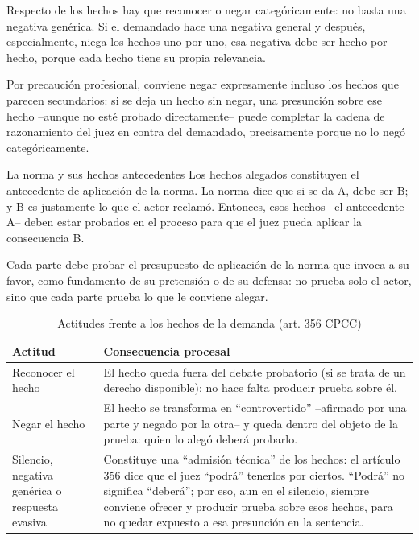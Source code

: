 \documentclass[12pt,oneside]{book}
\begin{document}
Respecto de los hechos hay que reconocer o negar categóricamente: no basta una negativa genérica. Si el demandado hace una negativa general y después, especialmente, niega los hechos uno por uno, esa negativa debe ser hecho por hecho, porque cada hecho tiene su propia relevancia.

\begin{note}
Por precaución profesional, conviene negar expresamente incluso los hechos que parecen secundarios: si se deja un hecho sin negar, una presunción sobre ese hecho --aunque no esté probado directamente-- puede completar la cadena de razonamiento del juez en contra del demandado, precisamente porque no lo negó categóricamente.
\end{note}

\begin{example}{La norma y sus hechos antecedentes}
Los hechos alegados constituyen el antecedente de aplicación de la norma. La norma dice que si se da A, debe ser B; y B es justamente lo que el actor reclamó. Entonces, esos hechos --el antecedente A-- deben estar probados en el proceso para que el juez pueda aplicar la consecuencia B.
\end{example}

Cada parte debe probar el presupuesto de aplicación de la norma que invoca a su favor, como fundamento de su pretensión o de su defensa: no prueba solo el actor, sino que cada parte prueba lo que le conviene alegar.

\begin{table}[H]
\centering
\caption{Actitudes frente a los hechos de la demanda (art. 356 CPCC)}
\begin{tabularx}{\textwidth}{>{\raggedright\arraybackslash}p{} >{\raggedright\arraybackslash}X}
\toprule
\textbf{Actitud} & \textbf{Consecuencia procesal} \\
\midrule
Reconocer el hecho & El hecho queda fuera del debate probatorio (si se trata de un derecho disponible); no hace falta producir prueba sobre él. \\
Negar el hecho & El hecho se transforma en ``controvertido'' --afirmado por una parte y negado por la otra-- y queda dentro del objeto de la prueba: quien lo alegó deberá probarlo. \\
Silencio, negativa genérica o respuesta evasiva & Constituye una ``admisión técnica'' de los hechos: el artículo 356 dice que el juez ``podrá'' tenerlos por ciertos. ``Podrá'' no significa ``deberá''; por eso, aun en el silencio, siempre conviene ofrecer y producir prueba sobre esos hechos, para no quedar expuesto a esa presunción en la sentencia. \\
\bottomrule
\end{tabularx}
\end{table}
\end{document}

